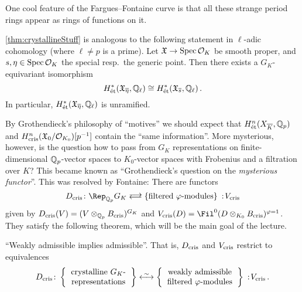 \documentclass[a4paper, 10pt, oneside, DIV=9, chapterprefix=true, numbers=enddot]{scrbook}
\begin{document}
\begin{rem}
\begin{numerate}
		One cool feature of the Fargues--Fontaine curve is that all these strange period rings appear as rings of functions on it.
		\item \cref{thm:crystallineStuff} is analogous to the following statement in $\ell$-adic cohomology (where $\ell\neq p$ is a prime). Let $\XX\morphism\Spec \Oo_K$ be smooth proper, and $s,\eta\in\operatorname{Spec} \mathcal{O}_K$ the special resp.\ the generic point. Then there exists a $G_K$-equivariant isomorphism
		\begin{equation*}
			H_\et^*(\XX_{\ov{\eta}},\IQ_\ell)\cong H_\et^*(\XX_{\ov{s}},\IQ_\ell)\,.
		\end{equation*}
		In particular, $H_\et^*(\XX_{\ov{\eta}},\IQ_\ell)$ is unramified.
		\item By Grothendieck's philosophy of \enquote{motives} we should expect that $H_\et^n(X_{\ov{K}},\IQ_p)$ and $H_{\mathrm{cris}}^n(\mathfrak{X}_0/\mathcal{O}_{K_0})[p^{-1}]$ contain the \enquote{same information}. More mysterious, however, is the question how to pass from $G_K$ representations on finite-dimensional $\mathbb{Q}_p$-vector spaces to $K_0$-vector spaces with Frobenius and a filtration over $K$? This became known as \enquote{Grothendieck's question on the \emph{mysterious functor}}. This was resolved by Fontaine: There are functors
		\begin{equation*}
			D_\cris\colon \Rep_{\IQ_p}G_K \doublelrmorphism \left\{\text{filtered }\phi\text{-modules}\right\}\noloc V_\cris
		\end{equation*} 
		given by $D_{\mathrm{cris}}(V)=(V\otimes_{\mathbb{Q}_p}B_{\mathrm{cris}})^{G_K}$ and $V_\cris(D)=\Fil^0(D\otimes_{K_0}B_\cris)^{\phi=1}$. They satisfy the following theorem, which will be the main goal of the lecture.
	\end{numerate}
\end{rem}
\begin{thm}\label{thm:ColmerzFontaine}
	\enquote{Weakly admissible implies admissible}. That is, $D_{\mathrm{cris}}$ and $V_{\mathrm{cris}}$ restrict to equivalences
	\begin{equation*}
		D_\cris\colon\left\{
		\begin{tabular}{c}
			crystalline $G_K$-\\
			representations
		\end{tabular}\right\}\lrisomorphism \left\{
		\begin{tabular}{c}
			weakly admissible\\
			filtered $\phi$-modules
		\end{tabular}
		\right\}\noloc V_\cris\,.
	\end{equation*}
\end{thm}
\end{document}
